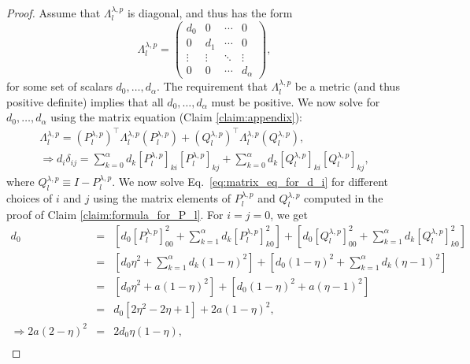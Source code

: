 \documentclass{article}
\numberwithin{myclaim}{section}
\newcommand{\eq}[1]{Eq.\ \ref{#1}}
\begin{document}
\begin{proof}
Assume that $\Lambda_l^{\lambda,p}$ is diagonal, and thus has the form
\begin{equation}
    \Lambda_l^{\lambda,p} =
    \left( 
    \begin{array}{cccc} 
        d_0 & 0 &\cdots & 0 \\
        0 & d_1 & \cdots &  0  \\
        \vdots & \vdots & \ddots & \vdots \\
        0 & 0 & \cdots & d_\alpha  
    \end{array} \right),
\end{equation}
for some set of scalars $d_0, \ldots, d_\alpha$. The requirement that $\Lambda_l^{\lambda,p}$ be a metric (and thus positive definite) implies that all $d_0, \ldots, d_\alpha$ must be positive. We now solve for $d_0, \ldots, d_\alpha$ using the matrix equation (Claim \ref{claim:appendix}):
\begin{eqnarray}
    \Lambda_l^{\lambda,p} = \left( P_l^{\lambda,p}\right)^\top \Lambda_l^{\lambda,p} \left(P_l^{\lambda,p}\right) + \left( Q_l^{\lambda,p}\right)^\top \Lambda_l^{\lambda,p} \left(Q_l^{\lambda,p}\right), \\
    \Rightarrow
    d_i \delta_{ij} = \sum_{k=0}^\alpha d_k [P_l^{\lambda,p}]_{ki} [P_l^{\lambda,p}]_{kj} +  \sum_{k=0}^\alpha d_k [Q_l^{\lambda,p}]_{ki} [Q_l^{\lambda,p}]_{kj}, \label{eq:matrix_eq_for_d_i} 
\end{eqnarray}
where $Q_l^{\lambda,p} \equiv I - P_l^{\lambda,p}$. We now solve \eq{eq:matrix_eq_for_d_i} for different choices of $i$ and $j$ using the matrix elements of $P_l^{\lambda,p}$ and $Q_l^{\lambda,p}$ computed in the proof of Claim \ref{claim:formula_for_P_l}. For $i = j = 0$, we get
\begin{eqnarray}
    d_0 &=& \left[ d_0 [P_l^{\lambda,p}]^2_{00} + \sum_{k=1}^\alpha d_k [P_l^{\lambda,p}]^2_{k0} \right] + \left[ d_0 [Q_l^{\lambda,p}]^2_{00} + \sum_{k=1}^\alpha d_k [Q_l^{\lambda,p}]^2_{k0} \right] \\
    &=& \left[ d_0 \eta^2 + \sum_{k=1}^\alpha d_k (1-\eta)^2 \right] + \left[ d_0 (1-\eta)^2 + \sum_{k=1}^\alpha d_k (\eta-1)^2 \right] \\
    &=& [d_0 \eta^2 + a (1-\eta)^2] + [d_0 (1-\eta)^2 + a (\eta-1)^2] \\
    &=& d_0 [2 \eta^2 - 2 \eta + 1] + 2 a(1-\eta)^2, \\
     \Rightarrow 2 a (2 - \eta)^2 &=& 2 d_0 \eta(1 - \eta), \\ 

\end{eqnarray}
\end{proof}
\end{document}
